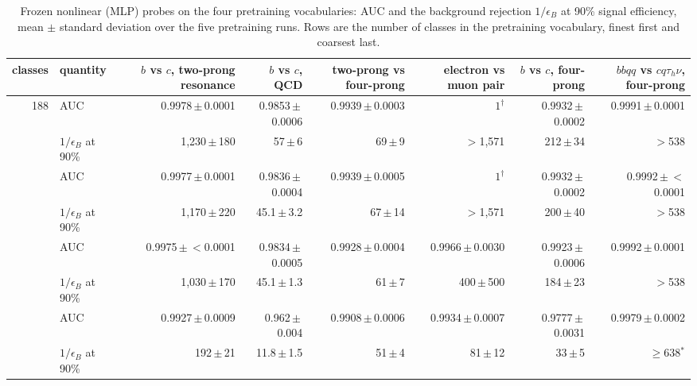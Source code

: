 \begin{table}[t]
\centering
\small
\setlength{\tabcolsep}{4pt}
\caption{Frozen nonlinear (MLP) probes on the four pretraining vocabularies: AUC and the background rejection $1/\epsilon_B$ at 90\% signal efficiency, mean $\pm$ standard deviation over the five pretraining runs. Rows are the number of classes in the pretraining vocabulary, finest first and coarsest last.}
\label{tab:probes-mlp}
\begin{adjustbox}{max width=\linewidth}
\begin{tabular}{r l rrrrrr}
\toprule
classes & quantity & $b$ vs $c$, two-prong resonance & $b$ vs $c$, QCD & two-prong vs four-prong & electron vs muon pair & $b$ vs $c$, four-prong & $bbqq$ vs $cq\tau_h\nu$, four-prong \\
\midrule
188 & AUC & 0.9978\,$\pm$\,0.0001 & 0.9853\,$\pm$\,0.0006 & 0.9939\,$\pm$\,0.0003 & $1^{\dagger}$ & 0.9932\,$\pm$\,0.0002 & 0.9991\,$\pm$\,0.0001 \\
     & $1/\epsilon_B$ at 90\% & 1{,}230\,$\pm$\,180 & 57\,$\pm$\,6 & 69\,$\pm$\,9 & $>$1{,}571 & 212\,$\pm$\,34 & $>$538 \\
\addlinespace
162 & AUC & 0.9977\,$\pm$\,0.0001 & 0.9836\,$\pm$\,0.0004 & 0.9939\,$\pm$\,0.0005 & $1^{\dagger}$ & 0.9932\,$\pm$\,0.0002 & 0.9992\,$\pm$\,$<$0.0001 \\
     & $1/\epsilon_B$ at 90\% & 1{,}170\,$\pm$\,220 & 45.1\,$\pm$\,3.2 & 67\,$\pm$\,14 & $>$1{,}571 & 200\,$\pm$\,40 & $>$538 \\
\addlinespace
43 & AUC & 0.9975\,$\pm$\,$<$0.0001 & 0.9834\,$\pm$\,0.0005 & 0.9928\,$\pm$\,0.0004 & 0.9966\,$\pm$\,0.0030 & 0.9923\,$\pm$\,0.0006 & 0.9992\,$\pm$\,0.0001 \\
     & $1/\epsilon_B$ at 90\% & 1{,}030\,$\pm$\,170 & 45.1\,$\pm$\,1.3 & 61\,$\pm$\,7 & 400\,$\pm$\,500 & 184\,$\pm$\,23 & $>$538 \\
\addlinespace
17 & AUC & 0.9927\,$\pm$\,0.0009 & 0.962\,$\pm$\,0.004 & 0.9908\,$\pm$\,0.0006 & 0.9934\,$\pm$\,0.0007 & 0.9777\,$\pm$\,0.0031 & 0.9979\,$\pm$\,0.0002 \\
     & $1/\epsilon_B$ at 90\% & 192\,$\pm$\,21 & 11.8\,$\pm$\,1.5 & 51\,$\pm$\,4 & 81\,$\pm$\,12 & 33\,$\pm$\,5 & $\geq$638$^{\ast}$ \\
\bottomrule
\end{tabular}
\end{adjustbox}
\par{}

\end{table}
